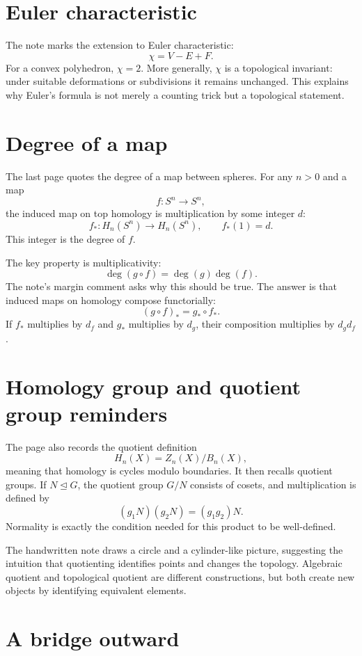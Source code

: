 \section{Euler characteristic}

The note marks the extension to Euler characteristic:
\[
  \chi=V-E+F.
\]
For a convex polyhedron, $\chi=2$.  More generally, $\chi$ is a topological invariant: under suitable deformations or subdivisions it remains unchanged.  This explains why Euler's formula is not merely a counting trick but a topological statement.

\section{Degree of a map}

The last page quotes the degree of a map between spheres.  For any $n>0$ and a map
\[
  f:S^n\to S^n,
\]
the induced map on top homology is multiplication by some integer $d$:
\[
  f_*:H_n(S^n)\to H_n(S^n),\qquad f_*(1)=d.
\]
This integer is the degree of $f$.

The key property is multiplicativity:
\[
  \deg(g\circ f)=\deg(g)\deg(f).
\]
The note's margin comment asks why this should be true.  The answer is that induced maps on homology compose functorially:
\[
  (g\circ f)_*=g_*\circ f_*.
\]
If $f_*$ multiplies by $d_f$ and $g_*$ multiplies by $d_g$, their composition multiplies by $d_gd_f$.

\section{Homology group and quotient group reminders}

The page also records the quotient definition
\[
  H_n(X)=Z_n(X)/B_n(X),
\]
meaning that homology is cycles modulo boundaries.  It then recalls quotient groups.  If $N\trianglelefteq G$, the quotient group $G/N$ consists of cosets, and multiplication is defined by
\[
  (g_1N)(g_2N)=(g_1g_2)N.
\]
Normality is exactly the condition needed for this product to be well-defined.

The handwritten note draws a circle and a cylinder-like picture, suggesting the intuition that quotienting identifies points and changes the topology.  Algebraic quotient and topological quotient are different constructions, but both create new objects by identifying equivalent elements.

\section{A bridge outward}

